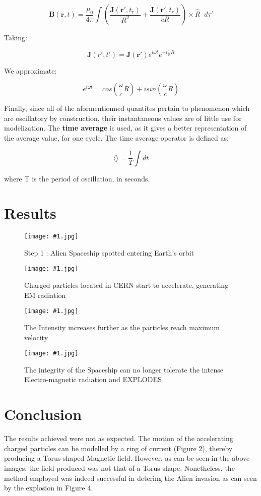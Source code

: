 \documentclass[twocolumn]{article}
\def\fig#1#2{\begin{figure}[!ht]\begin{center}
\texttt{[image: \#1.jpg]}
\end{center}\caption{#2}\label{#1}\end{figure}}
\renewcommand{\vec}[1]{\boldsymbol{#1}}
\begin{document}
\small
\begin{equation}
\vec{B}(\vec{r},t) = \frac{\mu_0}{4\pi}\int{
	\left(\frac{\vec{J}(\vec{r'},t_r)}{R^2}+\frac{ 
	\vec{\dot{J}}(\vec{r'},t_r)}{cR}\right)\times\hat{R}\;\;d\tau'}
\end{equation}
\normalsize
\par

\noindent Taking:

\begin{equation}
\vec{J}(r',t')=\vec{J(\vec{r'})}e^{i{\omega}t}e^{-i\frac{\omega}{c}R}
\end{equation}
\par

\indent We approximate:

\begin{equation}
e^{i{\omega}t}=cos\left(\frac{\omega}{c}R\right)+isin\left(\frac{\omega}{c}R\right)
\end{equation}
\par

\noindent Finally, since all of the aformentionned quantites pertain to phenomenon which are oscillatory by construction, their instantaneous values 
are of little use for modelization. The \textbf{time average} is used, as it gives a better representation of the average value, for one cycle. The 
time average operator is defined as:

\begin{equation}
\langle \rangle = \frac{1}{T} \int dt
\end{equation}

where T is the period of oscillation, in seconds.

\section{Results}
\fig{p-02a}{Step 1 : Alien Spaceship spotted entering Earth's orbit}

\fig{p-02b}{Charged particles located in CERN start to accelerate, generating EM radiation}

\fig{p-02c}{The Intensity increases further as the particles reach maximum velocity}

\fig{p-02d}{The integrity of the Spaceship can no longer tolerate the intense Electro-magnetic radiation and EXPLODES}

\section{Conclusion}
The results achieved were not as expected. The motion of the accelerating charged particles can be modelled by a ring of current (Figure 2), thereby 
producing a Torus shaped Magnetic field. However, as can be seen in the above images, the field produced was not that of a Torus shape. Nonetheless, 
the method employed was indeed successful in detering the Alien invasion as can seen by the explosion in Figure 4. 
\end{document}
